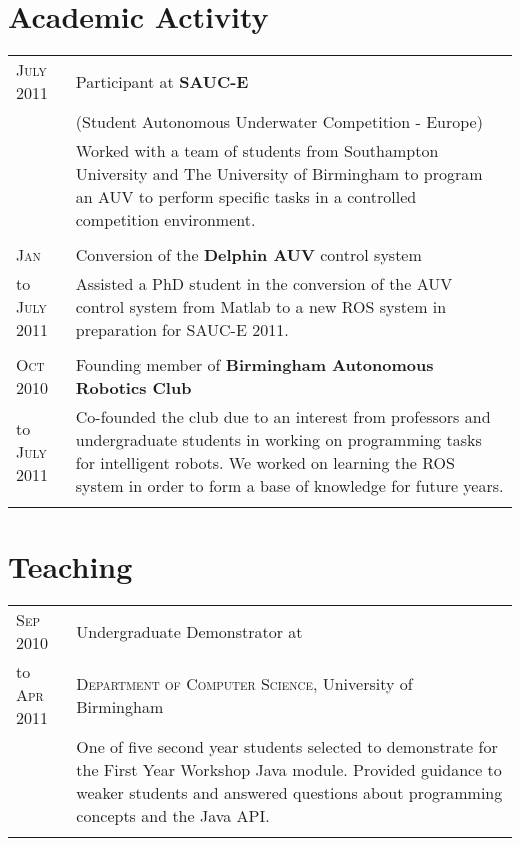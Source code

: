 \documentclass[a4paper,10pt]{article}
\begin{document}
\section{Academic Activity}
\begin{tabular}{l|p{11cm}}
  \textsc{July 2011}&Participant at \textbf{\textsc{SAUC-E}}\\
  & (Student Autonomous Underwater Competition - Europe)\\
  &\footnotesize{Worked with a team of students from Southampton University and The University of Birmingham to program an AUV to perform specific tasks in a controlled competition environment.}\\\multicolumn{2}{c}{}\\
  \textsc{Jan}&Conversion of the \textbf{Delphin AUV} control system\\
  to \textsc{July 2011}&\footnotesize{Assisted a PhD student in the conversion of the AUV control system from Matlab to a new \textsc{ROS} system in preparation for \textsc{SAUC-E 2011}.}\\\multicolumn{2}{c}{}\\
  \textsc{Oct 2010}&Founding member of \textbf{Birmingham Autonomous Robotics Club}\\
  to \textsc{July 2011}&\footnotesize{Co-founded the club due to an interest from professors and undergraduate students in working on programming tasks for intelligent robots. We worked on learning the \textsc{ROS} system in order to form a base of knowledge for future years.}\\\multicolumn{2}{c}{}\\
\end{tabular}

\section{Teaching}
\begin{tabular}{l|p{11cm}}
  \textsc{Sep 2010}& Undergraduate Demonstrator at \\
  to \textsc{Apr 2011}&\textsc{Department of Computer Science}, University of Birmingham\\
  &\footnotesize{One of five second year students selected to demonstrate for the First Year Workshop Java module. Provided guidance to weaker students and answered questions about programming concepts and the Java API.}\\\multicolumn{2}{c}{} \\
\end{tabular}
\end{document}
